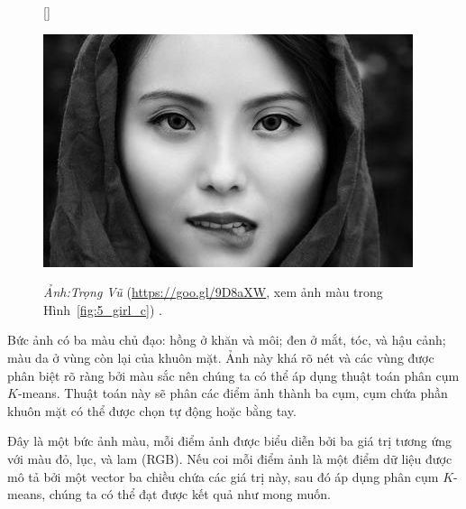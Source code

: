 \begin{figure}[t]
    [\FBwidth]
    {\caption{ 
    \textit{Ảnh:Trọng Vũ} (\url{https://goo.gl/9D8aXW}, xem ảnh màu trong Hình~\ref{fig:5_girl_c}) . 
    }
    \label{fig:5_girl}}
    { %
    \includegraphics[width=.5\textwidth]{Chapters/03_SimpleML/4_kmeans/girl3_gray.jpg}
    }
\end{figure}






Bức ảnh có ba màu chủ đạo: hồng ở khăn và môi; đen ở mắt, tóc, và hậu cảnh; màu
da ở vùng còn lại của khuôn mặt. Ảnh này khá rõ nét và các vùng được phân biệt
rõ ràng bởi màu sắc nên chúng ta có thể áp dụng thuật toán phân cụm $K$-means.
Thuật toán này sẽ phân các điểm ảnh thành ba cụm, cụm chứa phần khuôn mặt có thể được chọn tự động hoặc bằng tay. 

Đây là một bức ảnh màu, mỗi điểm ảnh được biểu diễn bởi ba giá trị tương ứng với
màu đỏ, lục, và lam (RGB). Nếu coi mỗi điểm ảnh là một điểm dữ liệu được mô tả
bởi một vector ba chiều chứa các giá trị này, sau đó áp dụng phân cụm $K$-means,
chúng ta có thể đạt được kết quả như mong muốn.



